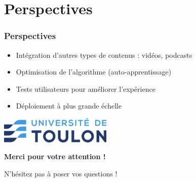 \documentclass{beamer}
\begin{document}
\section{Perspectives}
\begin{frame}
    \frametitle{Perspectives}
    \begin{itemize}
        \item Intégration d’autres types de contenus : vidéos, podcasts
        \item Optimisation de l’algorithme (auto-apprentissage)
        \item Tests utilisateurs pour améliorer l’expérience
        \item Déploiement à plus grande échelle
    \end{itemize}
\end{frame}

\begin{frame}[c]
    \centering
    \includegraphics[width=0.4\textwidth]{logo.png}

    \vspace{1cm}
    {\Huge \textbf{Merci pour votre attention !}}

    \vspace{1.5cm}
    {\Large N'hésitez pas à poser vos questions !}
\end{frame}
\end{document}
